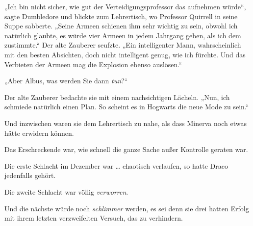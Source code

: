 „Ich bin nicht sicher, wie gut der Verteidigungsprofessor das aufnehmen würde“, sagte Dumbledore und blickte zum Lehrertisch, wo Professor Quirrell in seine Suppe sabberte.
„Seine Armeen schienen ihm sehr wichtig zu sein, obwohl ich natürlich glaubte, es würde vier Armeen in jedem Jahrgang geben, als ich dem zustimmte.“ Der alte Zauberer seufzte.
„Ein intelligenter Mann, wahrscheinlich mit den besten Absichten, doch nicht intelligent genug, wie ich fürchte. Und das Verbieten der Armeen mag die Explosion ebenso auslösen.“

„Aber Albus, was werden Sie dann \emph{tun}?“

Der alte Zauberer bedachte sie mit einem nachsichtigen Lächeln.
„Nun, ich schmiede natürlich einen Plan. So scheint es in Hogwarts die neue Mode zu sein.“

Und inzwischen waren sie dem Lehrertisch zu nahe, als dass Minerva noch etwas hätte erwidern können.

\later

Das Erschreckende war, wie schnell die ganze Sache außer Kontrolle geraten war.

Die erste Schlacht im Dezember war … chaotisch verlaufen, so hatte Draco jedenfalls gehört.

Die zweite Schlacht war völlig \emph{verworren}.

Und die nächste würde noch \emph{schlimmer} werden, es sei denn sie drei hatten Erfolg mit ihrem letzten verzweifelten Versuch, das zu verhindern.

